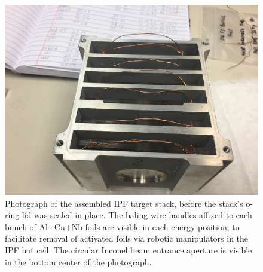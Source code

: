 \begin{figure}
 \centering
 \includegraphics[width=0.5\linewidth,clip=true,trim=13cm 0cm 3cm 6cm]{./figures/IMG_1975.JPG}
 \caption{\label{fig:target_stack}Photograph of the assembled IPF target stack, before the stack's o-ring lid was sealed in place. The baling wire handles affixed to each bunch of Al+Cu+Nb foils are visible in each energy position, to facilitate removal of activated foils via robotic manipulators in the IPF hot cell. The circular Inconel beam entrance aperture is visible in the bottom center of the photograph.  }
\end{figure}



